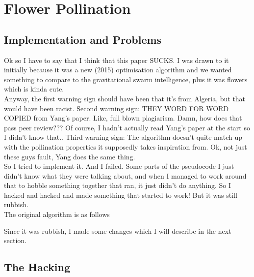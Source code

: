 \section{Flower Pollination}
\subsection{Implementation and Problems}

Ok so I have to say that I think that this paper\cite{7175923} SUCKS. I was drawn to it initially because it was a new (2015) optimisation algorithm and we wanted something to compare to the gravitational swarm intelligence\cite{bib:GravSwarm}, plus it was flowers which is kinda cute.\\
Anyway, the first warning sign should have been that it's from Algeria, but that would have been racist. Second warning sign: THEY WORD FOR WORD COPIED from Yang's paper. Like, full blown plagiarism. Damn, how does that pass peer review??? Of course, I hadn't actually read Yang's paper at the start so I didn't know that.. Third warning sign: The algorithm doesn't quite match up with the pollination properties it supposedly takes inspiration from. Ok, not just these guys fault, Yang does the same thing.\\
So I tried to implement it. And I failed. Some parts of the pseudocode I just didn't know what they were talking about, and when I managed to work around that to hobble something together that ran, it just didn't do anything. So I hacked and hacked and made something that started to work! But it was still rubbish.\\

The original algorithm is as follows




Since it was rubbish, I made some changes which I will describe in the next section.

\subsection{The Hacking}





